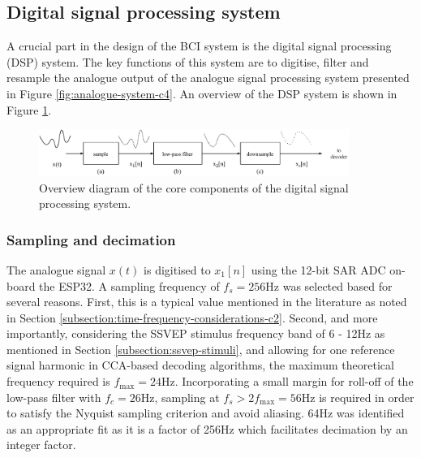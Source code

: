 \subsection{Digital signal processing system}

A crucial part in the design of the BCI system is the digital signal processing (DSP) system. The key functions of this system are to digitise, filter and resample the analogue output of the analogue signal processing system presented in Figure \ref{fig:analogue-system-c4}. An overview of the DSP system is shown in Figure \ref{fig:digital-system-c5}.

\begin{figure}[!htb]
    \centering
    \includegraphics[width=0.9\textwidth]{digital-system}
    \caption[Digital signal processing system]{Overview diagram of the core components of the digital signal processing system.}
    \label{fig:digital-system-c5}
\end{figure}

\subsubsection{Sampling and decimation}
The analogue signal $x(t)$ is digitised to $x_1[n]$ using the 12-bit SAR ADC on-board the ESP32. A sampling frequency of $f_s=256$Hz was selected based for several reasons. First, this is a typical value mentioned in the literature as noted in Section \ref{subsection:time-frequency-considerations-c2}. Second, and more importantly, considering the SSVEP stimulus frequency band of 6 - 12Hz as mentioned in Section \ref{subsection:ssvep-stimuli}, and allowing for one reference signal harmonic in CCA-based decoding algorithms, the maximum theoretical frequency required is $f_{\textrm{max}}=24$Hz. Incorporating a small margin for roll-off of the low-pass filter with $f_c=26$Hz, sampling at $f_s > 2f_{\textrm{max}} = 56$Hz is required in order to satisfy the Nyquist sampling criterion and avoid aliasing. 64Hz was identified as an appropriate fit as it is a factor of 256Hz which facilitates decimation by an integer factor.

